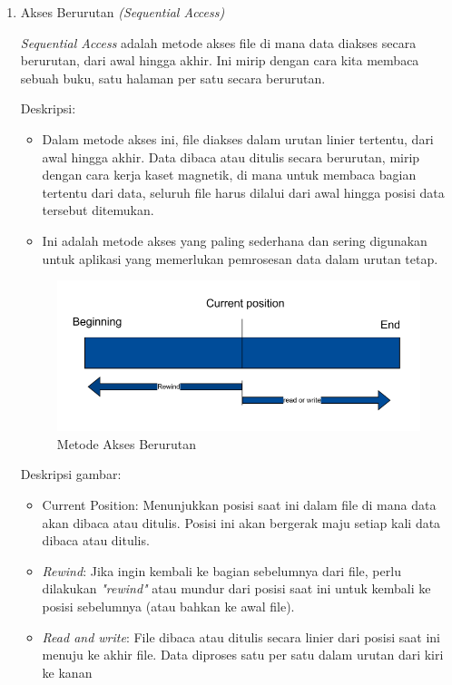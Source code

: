 \documentclass[12pt]{article}
\begin{document}
\begin{enumerate}
    \item Akses Berurutan \textit{(Sequential Access)}
    
    \textit{Sequential Access} adalah metode akses file di mana data diakses secara berurutan, dari awal hingga akhir. Ini mirip dengan cara kita membaca sebuah buku, satu halaman per satu secara berurutan.

    {Deskripsi:}
    \begin{itemize}
        \item Dalam metode akses ini, file diakses dalam urutan linier tertentu, dari awal hingga akhir. Data dibaca atau ditulis secara berurutan, mirip dengan cara kerja kaset magnetik, di mana untuk membaca bagian tertentu dari data, seluruh file harus dilalui dari awal hingga posisi data tersebut ditemukan.
        \item Ini adalah metode akses yang paling sederhana dan sering digunakan untuk aplikasi yang memerlukan pemrosesan data dalam urutan tetap.
    \end{itemize}

    \begin{figure}[h]
        \centering
        \includegraphics[width=0.5\linewidth]{assets/Screenshot 2024-09-30 184303.png}
        \caption{Metode Akses Berurutan}
        \label{fig:sequential-access}
    \end{figure}

    {Deskripsi gambar:}
     \begin{itemize}
        \item Current Position: Menunjukkan posisi saat ini dalam file di mana data akan dibaca atau ditulis. Posisi ini akan bergerak maju setiap kali data dibaca atau ditulis.

        \item \textit{Rewind}: Jika ingin kembali ke bagian sebelumnya dari file, perlu dilakukan \textit{"rewind"} atau mundur dari posisi saat ini untuk kembali ke posisi sebelumnya (atau bahkan ke awal file).

        \item \textit{Read and write}: File dibaca atau ditulis secara linier dari posisi saat ini menuju ke akhir file. Data diproses satu per satu dalam urutan dari kiri ke kanan


\end{itemize}
\end{enumerate}
\end{document}
